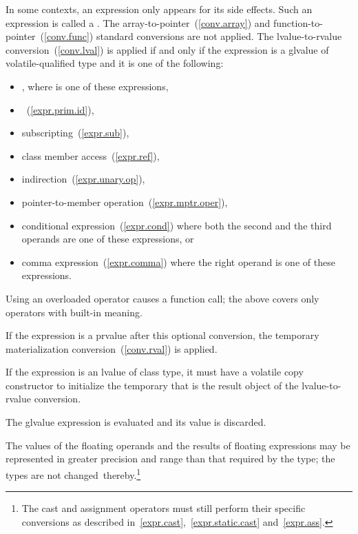 \pnum
In some contexts, an expression only appears for its side effects. Such an
expression is called a .
The array-to-pointer~(\ref{conv.array})
and function-to-pointer~(\ref{conv.func}) standard conversions are not
applied. The lvalue-to-rvalue conversion~(\ref{conv.lval}) is applied
if and only if
the expression is a glvalue of volatile-qualified type and it is one of the
following:

\begin{itemize}
\item \tcode{(}  \tcode{)}, where
   is one of these expressions,
\item {}~(\ref{expr.prim.id}),
\item subscripting~(\ref{expr.sub}),
\item class member access~(\ref{expr.ref}),
\item indirection~(\ref{expr.unary.op}),
\item pointer-to-member operation~(\ref{expr.mptr.oper}),
\item conditional expression~(\ref{expr.cond}) where both the second and the
      third operands are one of these expressions, or
\item comma expression~(\ref{expr.comma}) where the right operand is one of
      these expressions.
\end{itemize}

\begin{note} Using an overloaded operator causes a function call; the
above covers only operators with built-in meaning.
\end{note}
If the expression is a prvalue after this optional conversion,
the temporary materialization conversion~(\ref{conv.rval}) is applied.
\begin{note}
If the expression is an lvalue of
class type, it must have a volatile copy constructor to initialize the
temporary that is the result object of the lvalue-to-rvalue
conversion. \end{note}
The glvalue expression is evaluated and its value is discarded.

\pnum
The values of the floating operands and the results of floating
expressions may be represented in greater precision and range than that
required by the type; the types are not changed\
thereby.\footnote{The cast and assignment operators must still perform their specific
conversions as described in~\ref{expr.cast},~\ref{expr.static.cast}
and~\ref{expr.ass}.}

